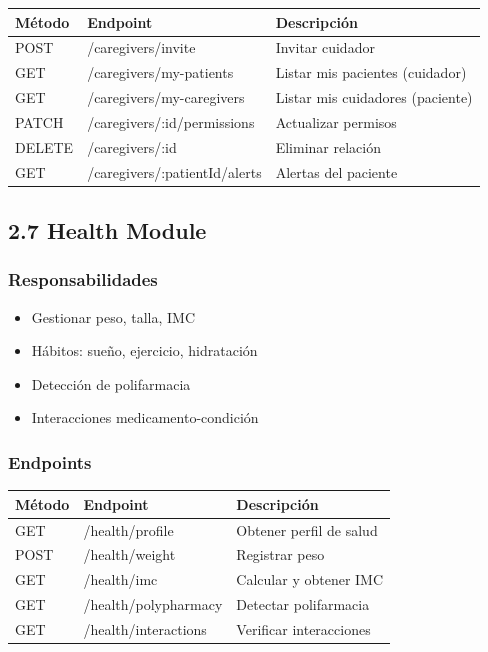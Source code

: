 \documentclass[12pt,a4paper]{article}
\begin{document}
\begin{center}
\begin{tabular}{|l|l|l|}
\hline
\rowcolor{lightblue}
\textbf{Método} & \textbf{Endpoint} & \textbf{Descripción} \\
\hline
POST & /caregivers/invite & Invitar cuidador \\
\hline
GET & /caregivers/my-patients & Listar mis pacientes (cuidador) \\
\hline
GET & /caregivers/my-caregivers & Listar mis cuidadores (paciente) \\
\hline
PATCH & /caregivers/:id/permissions & Actualizar permisos \\
\hline
DELETE & /caregivers/:id & Eliminar relación \\
\hline
GET & /caregivers/:patientId/alerts & Alertas del paciente \\
\hline
\end{tabular}
\end{center}

\subsection{2.7 Health Module}

\subsubsection{Responsabilidades}
\begin{itemize}
    \item Gestionar peso, talla, IMC
    \item Hábitos: sueño, ejercicio, hidratación
    \item Detección de polifarmacia
    \item Interacciones medicamento-condición
\end{itemize}

\subsubsection{Endpoints}

\begin{center}
\begin{tabular}{|l|l|l|}
\hline
\rowcolor{lightblue}
\textbf{Método} & \textbf{Endpoint} & \textbf{Descripción} \\
\hline
GET & /health/profile & Obtener perfil de salud \\
\hline
POST & /health/weight & Registrar peso \\
\hline
GET & /health/imc & Calcular y obtener IMC \\
\hline
GET & /health/polypharmacy & Detectar polifarmacia \\
\hline
GET & /health/interactions & Verificar interacciones \\
\hline
\end{tabular}
\end{center}
\end{document}
